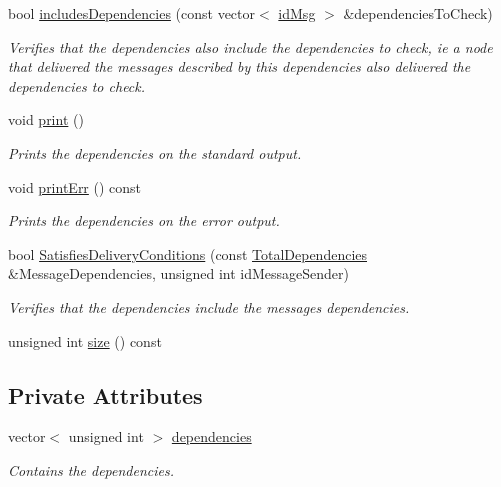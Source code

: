 \begin{DoxyCompactItemize}
bool \hyperlink{class_total_dependencies_aed1c3ce4bee031ca9341d8ce4a179ef0}{includes\+Dependencies} (const vector$<$ \hyperlink{structures_8h_a83a1d9a070efa5341da84cfd8e28d3e5}{id\+Msg} $>$ \&dependencies\+To\+Check)
\begin{DoxyCompactList}\small\item\em Verifies that the dependencies also include the dependencies to check, ie a node that delivered the messages described by this dependencies also delivered the dependencies to check. \end{DoxyCompactList}\item 
void \hyperlink{class_total_dependencies_abd5c49f26000acb2c45d8b967922c7e7}{print} ()
\begin{DoxyCompactList}\small\item\em Prints the dependencies on the standard output. \end{DoxyCompactList}\item 
void \hyperlink{class_total_dependencies_a514df10fe452f2000ceec5e279eae802}{print\+Err} () const
\begin{DoxyCompactList}\small\item\em Prints the dependencies on the error output. \end{DoxyCompactList}\item 
bool \hyperlink{class_total_dependencies_a6d050146cb0298091a4614610997d772}{Satisfies\+Delivery\+Conditions} (const \hyperlink{class_total_dependencies}{Total\+Dependencies} \&Message\+Dependencies, unsigned int id\+Message\+Sender)
\begin{DoxyCompactList}\small\item\em Verifies that the dependencies include the message\textquotesingle{}s dependencies. \end{DoxyCompactList}\item 
unsigned int \hyperlink{class_total_dependencies_a00ea27540cc51d5770d6013a21a41de2}{size} () const
\end{DoxyCompactItemize}
\subsection*{Private Attributes}
\begin{DoxyCompactItemize}
\item 
vector$<$ unsigned int $>$ \hyperlink{class_total_dependencies_a94825b4f782c30dfebf69dd2eba0bb1f}{dependencies}
\begin{DoxyCompactList}\small\item\em Contains the dependencies. \end{DoxyCompactList}\end{DoxyCompactItemize}


